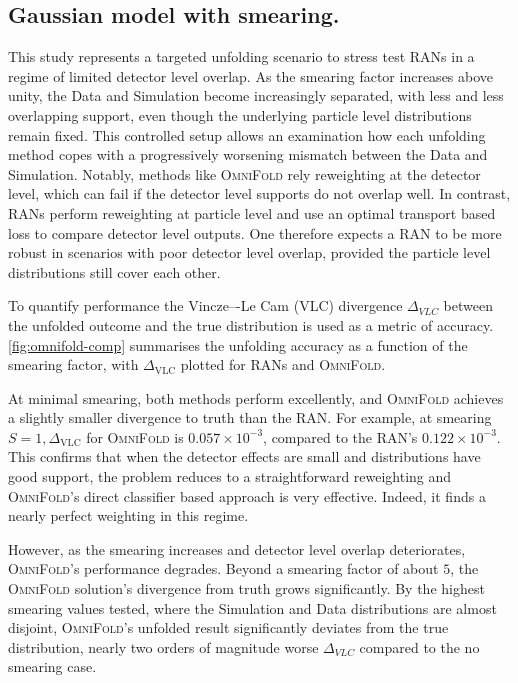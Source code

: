{{    \subsection{Gaussian model with smearing.}
        This study represents a targeted unfolding scenario to stress test RANs in a regime of limited detector level overlap.
        As the smearing factor increases above unity, the Data and Simulation become increasingly separated, with less and less overlapping support, even though the underlying particle level distributions remain fixed.
        This controlled setup allows an examination how each unfolding method copes with a progressively worsening mismatch between the Data and Simulation.
        Notably, methods like \textsc{OmniFold} rely reweighting at the detector level, which can fail if the detector level supports do not overlap well.
        In contrast, RANs perform reweighting at particle level and use an optimal transport based loss to compare detector level outputs.
        One therefore expects a RAN to be more robust in scenarios with poor detector level overlap, provided the particle level distributions still cover each other.

        To quantify performance the Vincze–-Le Cam (VLC) divergence $\Delta_{VLC}$ between the unfolded outcome and the true distribution is used as a metric of accuracy.
        \cref{fig:omnifold-comp} summarises the unfolding accuracy as a function of the smearing factor, with $\Delta_{\text{VLC}}$ plotted for RANs and \textsc{OmniFold}.

        At minimal smearing, both methods perform excellently, and \textsc{OmniFold} achieves a slightly smaller divergence to truth than the RAN.
        For example, at smearing $S = 1, \Delta_{\text{VLC}}$ for \textsc{OmniFold} is $0.057\times10^{-3}$, compared to the RAN’s $0.122\times10^{-3}$.
        This confirms that when the detector effects are small and distributions have good support, the problem reduces to a straightforward reweighting and \textsc{OmniFold}’s direct classifier based approach is very effective.
        Indeed, it finds a nearly perfect weighting in this regime.

        However, as the smearing increases and detector level overlap deteriorates, \textsc{OmniFold}’s performance degrades.
        Beyond a smearing factor of about $5$, the \textsc{OmniFold} solution’s divergence from truth grows significantly.
        By the highest smearing values tested, where the Simulation and Data distributions are almost disjoint, \textsc{OmniFold}’s unfolded result significantly deviates from the true distribution, nearly two orders of magnitude worse $\Delta_{VLC}$ compared to the no smearing case.
        
}}

